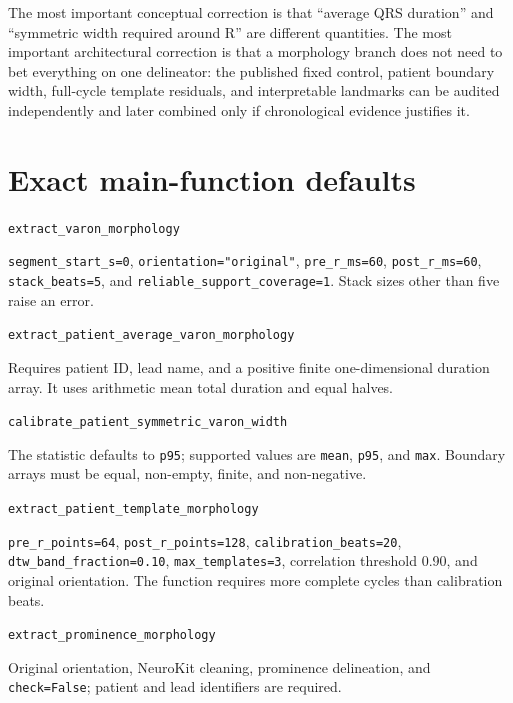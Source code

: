 \documentclass[11pt,a4paper]{article}
\begin{document}
The most important conceptual correction is that ``average QRS duration'' and ``symmetric width required around R'' are different quantities. The most important architectural correction is that a morphology branch does not need to bet everything on one delineator: the published fixed control, patient boundary width, full-cycle template residuals, and interpretable landmarks can be audited independently and later combined only if chronological evidence justifies it.

\appendix

\section{Exact main-function defaults}

\texttt{extract\_varon\_morphology}

\hspace*{1em}\texttt{segment\_start\_s=0}, \texttt{orientation="original"},
\texttt{pre\_r\_ms=60}, \texttt{post\_r\_ms=60},
\texttt{stack\_beats=5}, and \texttt{reliable\_support\_coverage=1}.
Stack sizes other than five raise an error.

\texttt{extract\_patient\_average\_varon\_morphology}

\hspace*{1em}Requires patient ID, lead name, and a positive finite
one-dimensional duration array. It uses arithmetic mean total duration and
equal halves.

\texttt{calibrate\_patient\_symmetric\_varon\_width}

\hspace*{1em}The statistic defaults to \texttt{p95}; supported values are
\texttt{mean}, \texttt{p95}, and \texttt{max}. Boundary arrays must be equal,
non-empty, finite, and non-negative.

\texttt{extract\_patient\_template\_morphology}

\hspace*{1em}\texttt{pre\_r\_points=64}, \texttt{post\_r\_points=128},
\texttt{calibration\_beats=20}, \texttt{dtw\_band\_fraction=0.10},
\texttt{max\_templates=3}, correlation threshold 0.90, and original
orientation. The function requires more complete cycles than calibration
beats.

\texttt{extract\_prominence\_morphology}

\hspace*{1em}Original orientation, NeuroKit cleaning, prominence delineation,
and \texttt{check=False}; patient and lead identifiers are required.
\end{document}
